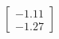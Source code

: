 \documentclass[preview]{standalone}
\begin{document}
\begin{align*}
\begin{bmatrix} -1.11 \\ -1.27 \end{bmatrix}
\end{align*}
\end{document}
